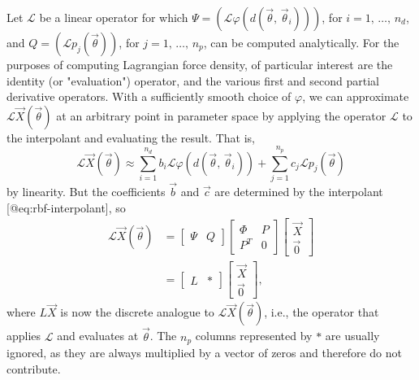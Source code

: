 Let $\mathcal{L}$ be a linear operator for which $\Psi=(\mathcal{L}\varphi(d(\vec{\theta},\,\vec{\theta}_i)))$,
for $i=1,\,\ldots,\,n_d$, and $Q=(\mathcal{L}p_j(\vec{\theta}))$, for $j=1,\,\ldots,\,n_p$,
can be computed analytically. For the purposes of computing Lagrangian force
density, of particular interest are the identity (or "evaluation") operator,
and the various first and second partial derivative operators. With
a sufficiently smooth choice of $\varphi$, we can approximate $\mathcal{L}\vec{X}(\vec{\theta})$
at an arbitrary point in parameter space by applying the operator $\mathcal{L}$
to the interpolant and evaluating the result. That is,
\begin{equation}
    \mathcal{L}\vec{X}(\vec{\theta})
    \approx \sum_{i=1}^{n_d} b_i\mathcal{L}\varphi(d(\vec{\theta},\,\vec{\theta}_i))
    + \sum_{j=1}^{n_p} c_j\mathcal{L}p_j(\vec{\theta})
\end{equation}
by linearity. But the coefficients $\vec{b}$ and $\vec{c}$ are determined by
the interpolant [@eq:rbf-interpolant], so
\begin{align}
    \mathcal{L}\vec{X}(\vec{\theta})
    &= \left[\begin{array}{cc}\Psi&Q\end{array}\right]
    \left[\begin{array}{cc}\Phi&P\\P^T&0\end{array}\right]
    \left[\begin{array}{c}\vec{X}\\\vec{0}\end{array}\right] \\
    &= \left[\begin{array}{cc}L&\ast\end{array}\right]
    \left[\begin{array}{c}\vec{X}\\\vec{0}\end{array}\right],
\end{align}
where $L\vec{X}$ is now the discrete analogue to $\mathcal{L}\vec{X}(\vec{\theta})$,
i.e., the operator that applies $\mathcal{L}$ and evaluates at $\vec{\theta}$.
The $n_p$ columns represented by $\ast$ are usually ignored, as they are
always multiplied by a vector of zeros and therefore do not contribute.

